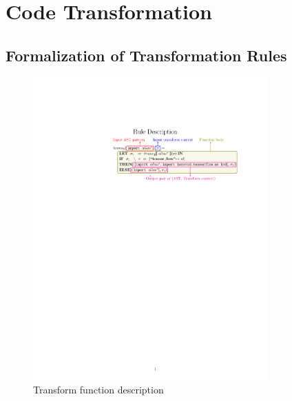 \section{Code Transformation}\label{sec:trans}

\subsection{Formalization of Transformation Rules}

\begin{figure}[ht!]
    \centering
    \includegraphics[width=0.8\textwidth]{transfn_expl.pdf}
    \caption{Transform function description}
    \label{fig:trans:fnexpl}
\end{figure}

